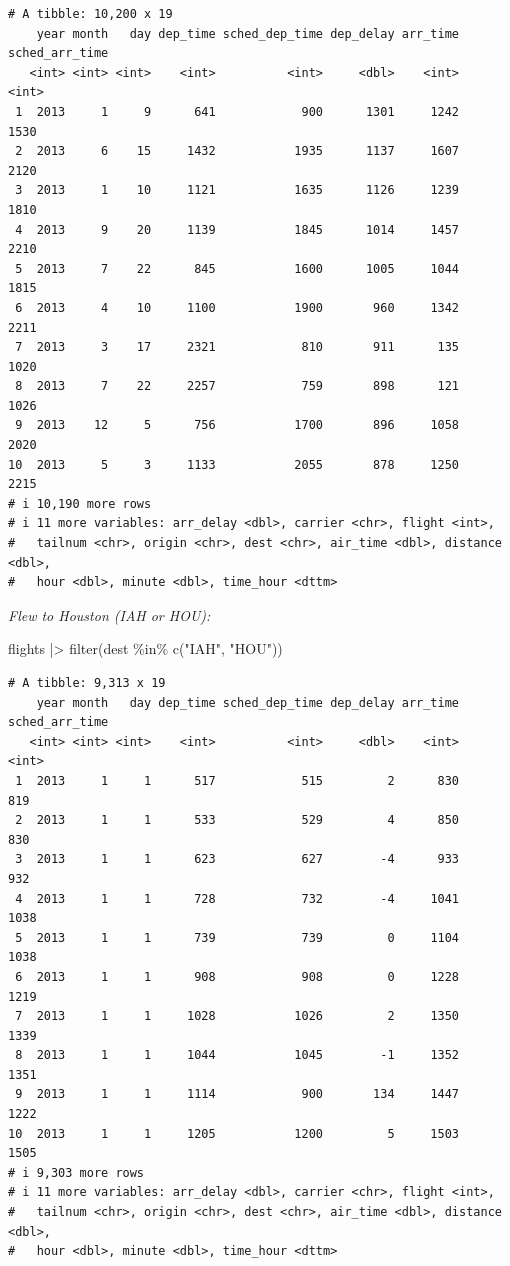 \documentclass[
  letterpaper,
  DIV=11,
  numbers=noendperiod]{scrreprt}
\newenvironment{Shaded}{\begin{snugshade}}{\end{snugshade}}
\newcommand{\FunctionTok}[1]{\textcolor[rgb]{0.28,0.35,0.67}{#1}}
\newcommand{\NormalTok}[1]{\textcolor[rgb]{0.00,0.23,0.31}{#1}}
\newcommand{\SpecialCharTok}[1]{\textcolor[rgb]{0.37,0.37,0.37}{#1}}
\newcommand{\StringTok}[1]{\textcolor[rgb]{0.13,0.47,0.30}{#1}}
\begin{document}
\begin{verbatim}
# A tibble: 10,200 x 19
    year month   day dep_time sched_dep_time dep_delay arr_time sched_arr_time
   <int> <int> <int>    <int>          <int>     <dbl>    <int>          <int>
 1  2013     1     9      641            900      1301     1242           1530
 2  2013     6    15     1432           1935      1137     1607           2120
 3  2013     1    10     1121           1635      1126     1239           1810
 4  2013     9    20     1139           1845      1014     1457           2210
 5  2013     7    22      845           1600      1005     1044           1815
 6  2013     4    10     1100           1900       960     1342           2211
 7  2013     3    17     2321            810       911      135           1020
 8  2013     7    22     2257            759       898      121           1026
 9  2013    12     5      756           1700       896     1058           2020
10  2013     5     3     1133           2055       878     1250           2215
# i 10,190 more rows
# i 11 more variables: arr_delay <dbl>, carrier <chr>, flight <int>,
#   tailnum <chr>, origin <chr>, dest <chr>, air_time <dbl>, distance <dbl>,
#   hour <dbl>, minute <dbl>, time_hour <dttm>
\end{verbatim}

\emph{Flew to Houston (IAH or HOU):}

\begin{Shaded}
\begin{Highlighting}[]
\NormalTok{flights }\SpecialCharTok{|\textgreater{}}
  \FunctionTok{filter}\NormalTok{(dest }\SpecialCharTok{\%in\%} \FunctionTok{c}\NormalTok{(}\StringTok{"IAH"}\NormalTok{, }\StringTok{"HOU"}\NormalTok{))}
\end{Highlighting}
\end{Shaded}

\begin{verbatim}
# A tibble: 9,313 x 19
    year month   day dep_time sched_dep_time dep_delay arr_time sched_arr_time
   <int> <int> <int>    <int>          <int>     <dbl>    <int>          <int>
 1  2013     1     1      517            515         2      830            819
 2  2013     1     1      533            529         4      850            830
 3  2013     1     1      623            627        -4      933            932
 4  2013     1     1      728            732        -4     1041           1038
 5  2013     1     1      739            739         0     1104           1038
 6  2013     1     1      908            908         0     1228           1219
 7  2013     1     1     1028           1026         2     1350           1339
 8  2013     1     1     1044           1045        -1     1352           1351
 9  2013     1     1     1114            900       134     1447           1222
10  2013     1     1     1205           1200         5     1503           1505
# i 9,303 more rows
# i 11 more variables: arr_delay <dbl>, carrier <chr>, flight <int>,
#   tailnum <chr>, origin <chr>, dest <chr>, air_time <dbl>, distance <dbl>,
#   hour <dbl>, minute <dbl>, time_hour <dttm>
\end{verbatim}
\end{document}

